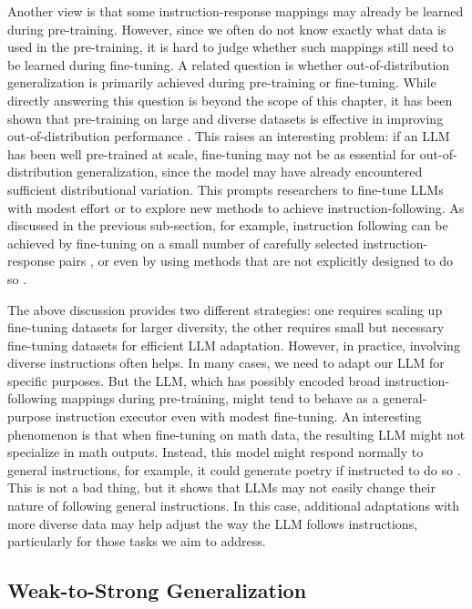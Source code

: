 Another view is that some instruction-response mappings may already be learned during pre-training. However, since we often do not know exactly what data is used in the pre-training, it is hard to judge whether such mappings still need to be learned during fine-tuning. A related question is whether out-of-distribution generalization is primarily achieved during pre-training or fine-tuning. While directly answering this question is beyond the scope of this chapter, it has been shown that pre-training on large and diverse datasets is effective in improving out-of-distribution performance \cite{hendrycks-etal:2020pretrained,radford-etal:2021learning,gunasekar-etal:2023textbooks}. This raises an interesting problem: if an LLM has been well pre-trained at scale, fine-tuning may not be as essential for out-of-distribution generalization, since the model may have already encountered sufficient distributional variation. This prompts researchers to fine-tune LLMs with modest effort or to explore new methods to achieve instruction-following. As discussed in the previous sub-section, for example, instruction following can be achieved by fine-tuning on a small number of carefully selected instruction-response pairs \cite{zhou-etal:2023lima}, or even by using methods that are not explicitly designed to do so \cite{kung-and-peng:2023models}.

The above discussion provides two different strategies: one requires scaling up fine-tuning datasets for larger diversity, the other requires small but necessary fine-tuning datasets for efficient LLM adaptation. However, in practice, involving diverse instructions often helps. In many cases, we need to adapt our LLM for specific purposes. But the LLM, which has possibly  encoded broad instruction-following mappings during pre-training, might tend to behave as a general-purpose instruction executor even with modest fine-tuning. An interesting phenomenon is that when fine-tuning on math data, the resulting LLM might not specialize in math outputs. Instead, this model might respond normally to general instructions, for example, it could generate poetry if instructed to do so \cite{hewitt:2024instructionblog}. This is not a bad thing, but it shows that LLMs may not easily change their nature of following general instructions. In this case, additional adaptations with more diverse data may help adjust the way the LLM follows instructions, particularly for those tasks we aim to address.

\subsection{Weak-to-Strong Generalization}

